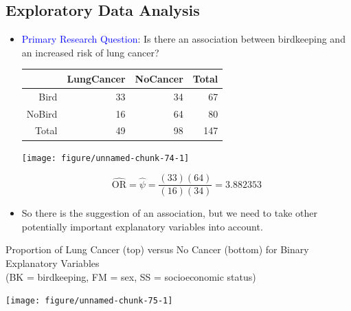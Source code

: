\documentclass[oneside]{book}\usepackage[]{graphicx}\usepackage[svgnames]{xcolor}
\newenvironment{knitrout}{}{} %
\begin{document}
\subsection*{Exploratory Data Analysis}
\begin{itemize}
      \item \textcolor{Blue}{Primary Research Question}: Is there an association between birdkeeping and an
            increased risk of lung cancer?
            \begin{table}[!htbp]
                  \centering
                  \begin{tabular}{rrrr}
                        \toprule
                               & LungCancer & NoCancer & Total \\
                        \midrule
                        Bird   & 33         & 34       & 67    \\
                        NoBird & 16         & 64       & 80    \\
                        \midrule
                        Total  & 49         & 98       & 147   \\
                        \bottomrule
                  \end{tabular}
            \end{table}
\begin{knitrout}
\color{fgcolor}

{\centering \texttt{[image: figure/unnamed-chunk-74-1]} 

}


\end{knitrout}
            \[ \widehat{\text{OR}}=\hat{\psi}=\frac{(33)(64)}{(16)(34)}=3.882353 \]
      \item So there is the suggestion of an association, but we need to take other potentially
            important explanatory variables into account.
\end{itemize}
\begin{center}
      Proportion of Lung Cancer (top) versus No Cancer (bottom) for Binary Explanatory Variables\\
      (BK = birdkeeping, FM = sex, SS = socioeconomic status)
\end{center}
\begin{knitrout}
\color{fgcolor}

{\centering \texttt{[image: figure/unnamed-chunk-75-1]} 

}


\end{knitrout}
\end{document}
